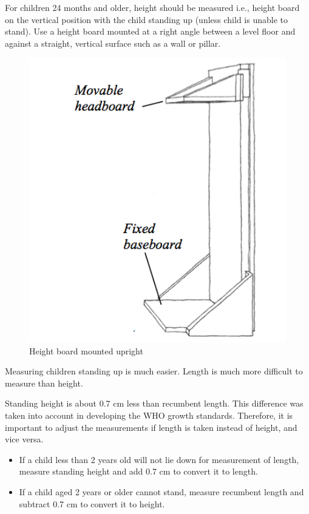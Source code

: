 \documentclass[12pt,]{book}
\theoremstyle{definition}
\theoremstyle{definition}
\theoremstyle{definition}
\theoremstyle{remark}
\begin{document}
For children 24 months and older, height should be measured i.e., height
board on the vertical position with the child standing up (unless child
is unable to stand). Use a height board mounted at a right angle between
a level floor and against a straight, vertical surface such as a wall or
pillar.

\begin{figure}

{\centering \includegraphics[width=5.4in]{images/heightBoard04} 

}

\caption{Height board mounted upright}\label{fig:height05}
\end{figure}

Measuring children standing up is much easier. Length is much more
difficult to measure than height.

Standing height is about 0.7 cm less than recumbent length. This
difference was taken into account in developing the WHO growth
standards. Therefore, it is important to adjust the measurements if
length is taken instead of height, and vice versa.

\begin{itemize}
\item
  If a child less than 2 years old will not lie down for measurement of
  length, measure standing height and add 0.7 cm to convert it to
  length.
\item
  If a child aged 2 years or older cannot stand, measure recumbent
  length and subtract 0.7 cm to convert it to height.
\end{itemize}
\end{document}
